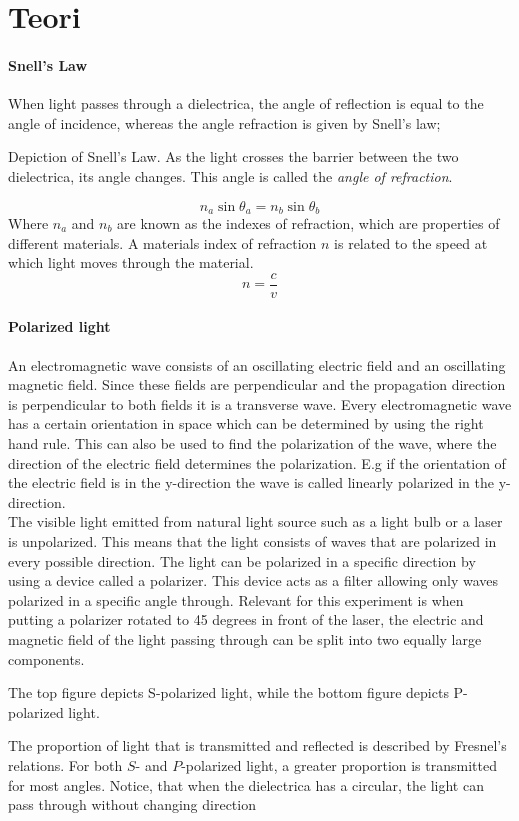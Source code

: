 \documentclass[working]{inputs/tuftebook}
\begin{document}
\chapter*{Teori}
\subsubsection*{Snell's Law}
When light passes through a dielectrica, the angle of reflection is equal to the angle of incidence, whereas the angle refraction is given by Snell's law;
\begin{marginfigure}
    \caption{Depiction of Snell's Law. As the light crosses the barrier between the two dielectrica, its angle changes. This angle is called the \textit{angle of refraction}.}
    \label{fig:snell}
\end{marginfigure}
\[
	\boxed{n_a \sin \theta_a = n_b \sin \theta_b}
\]
Where $n_a$ and $n_b$ are known as the indexes of refraction, which are properties of different materials. A materials index of refraction $n$ is related to the speed at which light moves through the material.
\[
n = \frac{c}{v}
\]
\subsubsection{Polarized light}
An electromagnetic wave consists of an oscillating electric field and an oscillating magnetic field. Since these fields are perpendicular and the propagation direction is perpendicular to both fields it is a transverse wave. Every electromagnetic wave has a certain orientation in space which can be determined by using the right hand rule. This can also be used to find the polarization of the wave, where the direction of the electric field determines the polarization. E.g if the orientation of the electric field is in the y-direction the wave is called linearly polarized in the y-direction.
\\
The visible light emitted from natural light source such as a light bulb or a laser is unpolarized. This means that the light consists of waves that are polarized in every possible direction. The light can be polarized in a specific direction by using a device called a polarizer. This device acts as a filter allowing only waves polarized in a specific angle through. Relevant for this experiment is when putting a polarizer rotated to 45 degrees in front of the laser, the electric and magnetic field of the light passing through can be split into two equally large components.

\begin{marginfigure}
    \caption{The top figure depicts S-polarized light, while the bottom figure depicts P-polarized light.}
    \label{fig:polarized}
\end{marginfigure}
\begin{marginfigure}
    \caption{The proportion of light that is transmitted and reflected is described by Fresnel's relations. For both $S$- and $P$-polarized light, a greater proportion is transmitted for most angles. Notice, that when the dielectrica has a circular, the light can pass through without changing direction} 
    \label{fig:fresnel1}
\end{marginfigure}
\end{document}
